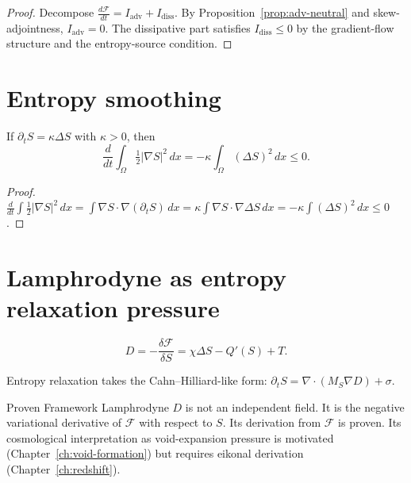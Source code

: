 \begin{proof}
  Decompose $\frac{d\mathcal{F}}{dt} = I_{\mathrm{adv}} + I_{\mathrm{diss}}$.
  By Proposition~\ref{prop:adv-neutral} and skew-adjointness,
  $I_{\mathrm{adv}} = 0$.
  The dissipative part satisfies
  $I_{\mathrm{diss}} \leq 0$ by the gradient-flow structure
  and the entropy-source condition.
\end{proof}

\section{Entropy smoothing}

\begin{proposition}
  \label{prop:entropy-smooth}
  \statusproven{}
  If $\partial_t S = \kappa\Delta S$ with $\kappa > 0$, then
  \[
    \frac{d}{dt}\int_\Omega \tfrac{1}{2}|\nabla S|^2\,dx
    = -\kappa\int_\Omega(\Delta S)^2\,dx \leq 0.
  \]
\end{proposition}

\begin{proof}
  $\frac{d}{dt}\int\frac{1}{2}|\nabla S|^2\,dx
  = \int\nabla S\cdot\nabla(\partial_t S)\,dx
  = \kappa\int\nabla S\cdot\nabla\Delta S\,dx
  = -\kappa\int(\Delta S)^2\,dx \leq 0$.
\end{proof}

\section{Lamphrodyne as entropy relaxation pressure}

\begin{definition}[Lamphrodyne]
  \label{def:lamphrodyne}
  \[
    D = -\frac{\delta\mathcal{F}}{\delta S}
    = \chi\Delta S - Q'(S) + T.
  \]
\end{definition}

Entropy relaxation takes the Cahn--Hilliard-like form:
$\partial_t S = \nabla\cdot(M_S\nabla D) + \sigma$.

\begin{StatusBox}{Proven Framework}
  Lamphrodyne $D$ is not an independent field.
  It is the negative variational derivative of $\mathcal{F}$
  with respect to $S$.
  Its derivation from $\mathcal{F}$ is proven.
  Its cosmological interpretation as void-expansion pressure
  is motivated (Chapter~\ref{ch:void-formation}) but requires
  eikonal derivation (Chapter~\ref{ch:redshift}).
\end{StatusBox}
